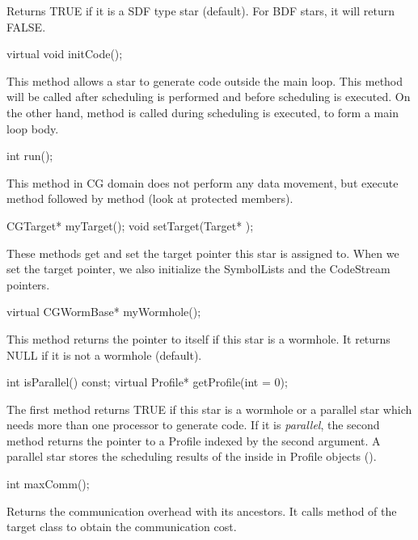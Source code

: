 Returns TRUE if it is a SDF type star (default). For BDF stars, 
it will return FALSE.

\begin{example}
virtual void initCode();
\end{example}

This method allows a star to generate code outside the main loop.
This method will be called after scheduling is performed and before
scheduling is executed. On the other hand,  method is called
during scheduling is executed, to form a main loop body.

\begin{example}
int run();
\end{example}

This method in CG domain does not perform any data movement, but
execute  method followed by  method (look at
protected members).

\begin{example}
CGTarget* myTarget();
void setTarget(Target* );
\end{example}

These methods get and set the target pointer this star is assigned to.
When we set the target pointer, we also initialize the SymbolLists and
the CodeStream pointers.

\begin{example}
virtual CGWormBase* myWormhole();
\end{example}

This method returns the pointer to itself if this star is a wormhole. 
It returns NULL if it is not a wormhole (default).

\begin{example}
int isParallel() const;
virtual Profile* getProfile(int  = 0);
\end{example}

The first method returns TRUE if this star is a wormhole or a parallel 
star which needs more than one processor to generate code. If it is
\emph{parallel}, the second method returns the pointer to a Profile
indexed by the second argument. A parallel star stores the scheduling
results of the inside in Profile objects ().

\begin{example}
int maxComm();
\end{example}

Returns the communication overhead with its ancestors. It calls
 method of the target class to obtain the communication
cost.

